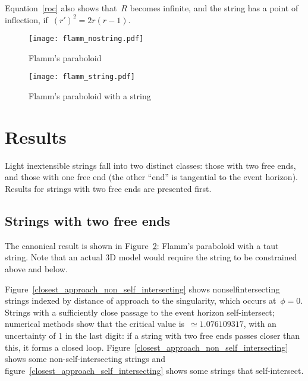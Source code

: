 \documentclass[prb,preprint]{revtex4-1}
\begin{document}
% 
% 
% 

Equation~\ref{roc} also shows that~$R$ becomes infinite, and the
string has a point of inflection,
if~$\left(r'\right)^2=2r\left(r-1\right)$.

\begin{figure}[h!]
\centering
\texttt{[image: flamm\_nostring.pdf]}
\caption{Flamm's paraboloid}
\label{flamm_nostring}
\end{figure}

\begin{figure}[h!]
\centering
\texttt{[image: flamm\_string.pdf]}
\caption{Flamm's paraboloid with a string}
\label{flamm_withstring}
\end{figure}

\section{Results}
Light inextensible strings fall into two distinct classes: those with
two free ends, and those with one free end (the other ``end'' is
tangential to the event horizon).  Results for strings with two free
ends are presented first.


\subsection{Strings with two free ends}

The canonical result is shown in Figure~\ref{flamm_withstring}:
Flamm's paraboloid with a taut string.  Note that an actual 3D model
would require the string to be constrained above and below.

Figure~\ref{closest_approach_non_self_intersecting} shows
nonselfintersecting strings indexed by distance of approach to the
singularity, which occurs at~$\phi=0$.  Strings with a sufficiently
close passage to the event horizon self-intersect; numerical methods
show that the critical value is~$\simeq 1.076109317$, with an
uncertainty of 1 in the last digit: if a string with two free ends
passes closer than this, it forms a closed loop.
Figure~\ref{closest_approach_non_self_intersecting} shows some
non-self-intersecting strings and
figure~\ref{closest_approach_self_intersecting} shows some strings
that self-intersect.
\end{document}
